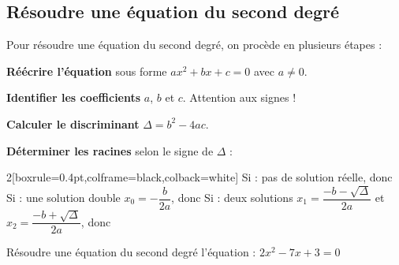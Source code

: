 \subsection{Résoudre une équation du second degré}
\begin{Methode}
Pour résoudre une équation du second degré, on procède en plusieurs étapes :

\begin{tcbenumerate}
\tcbitem\textbf{Réécrire l'équation} sous forme  $ax^2+bx+c=0$ avec $a\neq 0$.

\tcbitem\textbf{Identifier les coefficients} $a$, $b$ et $c$. Attention aux signes !

\tcbitem\textbf{Calculer le discriminant} $\Delta = b^2-4ac$.

\tcbitem\textbf{Déterminer les racines} selon le signe de $\Delta$ :

\begin{MultiColonnes}{2}[boxrule=0.4pt,colframe=black,colback=white]
    \tcbitem[valign=center] Si  : pas de solution réelle, donc 
    \tcbitem Si  : une solution double $x_0=-\dfrac{b}{2a}$, donc 
    \tcbitem[raster multicolumn=2] Si  : deux solutions $x_1=\dfrac{-b-\sqrt{\Delta}}{2a}$ et $x_2=\dfrac{-b+\sqrt{\Delta}}{2a}$, donc 
\end{MultiColonnes}
\end{tcbenumerate}
\end{Methode}
\begin{EXO}{Résoudre une équation du second degré}{}
 l'équation : $2x^2-7x+3=0$
\begin{crep}[colback=white]


\end{crep}
\exocorrection



\end{EXO}

